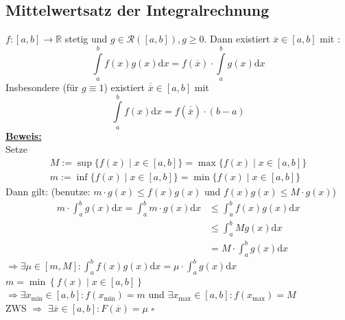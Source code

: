 \subsection{Mittelwertsatz der Integralrechnung} %
\label{sub:mittelwertsatz_der_integralrechnung}
$f: [a,b] \to \mathds{R}$ stetig und $g \in \mathcal{R}([a,b]), g \ge 0 $. Dann existiert $\overline{x} \in [a,b]$ mit : 
\[
	\int\limits_{a}^{b} \! f(x) g(x)  \mathrm{d}x = f(\overline{x}) \cdot \int\limits_{a}^{b} \! g(x)  \mathrm{d}x 
\]
Insbesondere (für $g \equiv 1$) existiert $\overline{\overline{x}} \in [a,b]$ mit
\[
	\int\limits_{a}^{b} \! f(x)  \mathrm{d}x = f(\overline{\overline{x}} ) \cdot (b-a)
\]
\underline{\textbf{Beweis:}} \\
Setze 
\begin{gather*}
		M := \sup \Big\{  f(x) \mid x \in [a,b]  \Big\} = \max \Big\{ f(x) \mid  x \in [a,b] \Big\} \\
		m := \inf \Big\{f(x) \mid x \in [a,b]  \Big\} = \min \Big\{ f(x) \mid  x \in [a,b] \Big\}
\end{gather*}
Dann gilt: {\small (benutze: $m \cdot g(x) \le f(x) g(x)$ und $f(x) g(x)\le M \cdot g(x)$)}
\begin{align*}
	m \cdot \int_{a} ^{b} \! g(x)  \mathrm{d}x = \int_{a} ^{b} \! m \cdot g(x)  \mathrm{d}x &\le \int_{a} ^{b} \! f(x) g(x)  \mathrm{d}x \\
	&\le \int_{a} ^{b} \! M g(x)  \mathrm{d}x  \\
	&= M \cdot \int_{a} ^{b} \! g(x)  \mathrm{d}x \tag{da $g$ positiv} 
\end{align*}
$\Rightarrow \exists \mu \in [m,M] : \int_{a} ^{b} \! f(x) g(x)  \mathrm{d}x  = \mu \cdot \int_{a} ^{b} \! g(x) \mathrm{d}x $
\vspace{10pt} \\
$m= \min \left\{ f(x) \mid x \in [a,b] \right\}$ \\
$\Rightarrow \exists x_{\min} \in [a,b] : f(x_{\min}) = m$ und  $\exists x_{\max} \in [a,b] : f(x_{\max}) = M$
\vspace{10pt} \\
ZWS $\Rightarrow $ $\exists \overline{x} \in [a,b] : F(\overline{x}) = \mu$ \hfill \( \square \)

